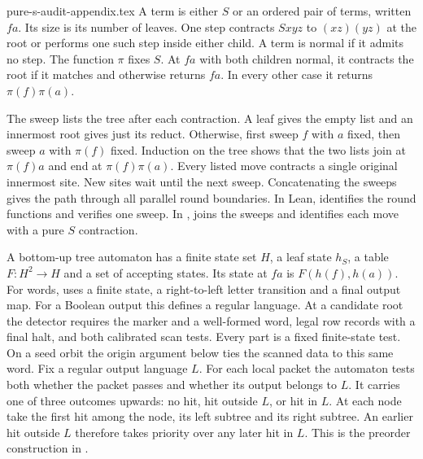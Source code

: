 \begin{filecontents*}[overwrite]{pure-s-audit-appendix.tex}
A term is either $S$ or an ordered pair of terms, written $fa$.
Its size is its number of leaves. One step contracts $Sxyz$ to $(xz)(yz)$
at the root or performs one such step inside either child.
A term is normal if it admits no step. The function $\pi$ fixes $S$.
At $fa$ with both children normal, it contracts the root if it matches and
otherwise returns $fa$. In every other case it returns $\pi(f)\pi(a)$.

The sweep lists the tree after each contraction. A leaf gives the empty list and an innermost root gives just its reduct.
Otherwise, first sweep $f$ with $a$ fixed, then sweep $a$ with $\pi(f)$
fixed. Induction on the tree shows that the two lists join at
$\pi(f)a$ and end at $\pi(f)\pi(a)$. Every listed move contracts a single
original innermost site. New sites wait until the next sweep. Concatenating
the sweeps gives the path through all parallel round boundaries.
In Lean,  identifies
the round functions and
 verifies one
sweep. In ,  joins
the sweeps and  identifies each move with a pure
$S$ contraction.

A bottom-up tree automaton has a finite state set $H$, a leaf state $h_S$,
a table $F:H^2\to H$ and a set of accepting states.
Its state at $fa$ is $F(h(f),h(a))$. For words, 
uses a finite state, a right-to-left letter transition and a final output
map. For a Boolean output this defines a regular language.
At a candidate root the detector requires the marker and a well-formed
word, legal row records with a final halt, and both calibrated scan tests.
Every part is a fixed finite-state test. On a seed orbit the origin
argument below ties the scanned data to this same word.
Fix a regular output language $L$. For each local packet the automaton tests both
whether the packet passes and whether its output belongs to $L$.
It carries one of three outcomes upwards: no hit, hit outside $L$, or hit
in $L$. At each node take the first hit among the node, its left subtree
and its right subtree. An earlier hit outside $L$ therefore takes priority
over any later hit in $L$. This is the preorder construction in
.


\end{filecontents*}
